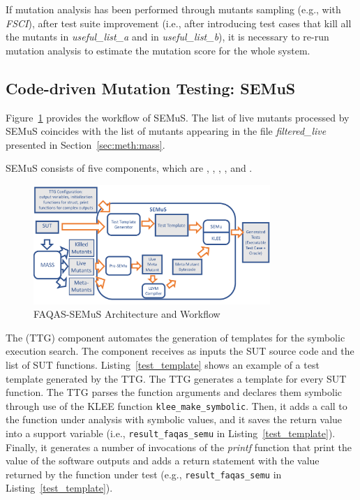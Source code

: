 {If mutation analysis has been performed through mutants sampling (e.g., with \emph{FSCI}), after test suite improvement (i.e., after introducing test cases that kill all the mutants in \emph{useful\_list\_a} and in \emph{useful\_list\_b}), it is necessary to re-run mutation analysis to estimate the mutation score for the whole system.

\clearpage

\subsection{Code-driven Mutation Testing: SEMuS}
\label{sec:meth:semus}

Figure~\ref{fig:semus_architecture} provides the workflow of SEMuS. The list of live mutants processed by SEMuS coincides with the list of mutants appearing in the file \emph{filtered\_live} presented in Section~\ref{sec:meth:mass}.

SEMuS consists of five components, which are ,  ,  ,  , and .

\begin{figure}[h]
\begin{center}
\includegraphics[width=0.8\textwidth]{images/semus-architecture2}
\caption{FAQAS-SEMuS Architecture and Workflow}
\label{fig:semus_architecture}
\end{center}
\end{figure}


The  (TTG) component automates the generation of templates for the symbolic execution search. The component receives as inputs the SUT source code and the list of SUT functions. 
Listing~\ref{test_template} shows an example of a test template generated by the TTG. The TTG generates a template for every SUT function. The TTG parses the function arguments and declares them symbolic through use of the KLEE function \texttt{klee\_make\_symbolic}. Then, it adds a call to the function under analysis with symbolic values, and it saves the return value into a support variable (i.e., \texttt{result\_faqas\_semu} in Listing~\ref{test_template}). Finally, it generates a number of invocations of the \emph{printf} function that print the value of the software outputs and adds a return statement with the value returned by the function under test (e.g., \texttt{result\_faqas\_semu} in Listing~\ref{test_template}). 


}
